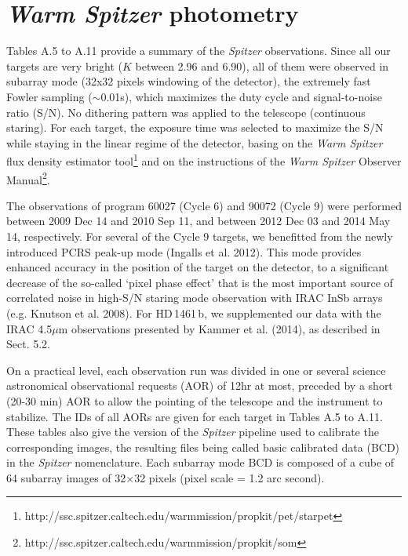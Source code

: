 \documentclass[traditabstract]{aa}
\begin{document}
\section{{\it Warm  Spitzer} photometry}

Tables A.5 to A.11 provide a summary of the {\it Spitzer} observations. Since all our targets are very bright ($K$ between
 2.96 and 6.90), all of them were observed in subarray mode (32x32 pixels windowing of the detector), the extremely
  fast Fowler sampling ($\sim$0.01s), which maximizes the duty cycle and signal-to-noise ratio (S/N). No dithering pattern 
  was applied to the telescope (continuous staring). For each target, the exposure time was selected to maximize the 
S/N while staying in the linear regime of the detector, basing on the  {\it Warm Spitzer} flux density estimator 
tool\footnote{http://ssc.spitzer.caltech.edu/warmmission/propkit/pet/starpet} and on the instructions of the 
{\it Warm Spitzer} Observer Manual\footnote{http://ssc.spitzer.caltech.edu/warmmission/propkit/som}.

The observations of program 60027 (Cycle 6) and 90072 (Cycle 9) were performed between 2009 Dec 14 and 2010 
Sep 11, and between 2012 Dec 03 and 2014 May 14, respectively. For several of the Cycle 9 targets, we benefitted 
from the  newly introduced PCRS peak-up mode (Ingalls et al. 2012). This mode provides enhanced accuracy in the 
position of the target on the detector,  to a significant decrease of the so-called `pixel phase effect' that is the most important 
source of correlated noise in high-S/N staring mode observation with IRAC InSb arrays (e.g. Knutson et al. 2008). 
For HD\,1461\,b, we supplemented our data with the IRAC 4.5$\mu$m observations presented by 
Kammer et al. (2014), as described in Sect. 5.2. 

On a practical level, each observation run was divided in one or several science astronomical observational requests (AOR) 
of 12hr at most, preceded by a short (20-30 min) AOR to allow the pointing of the telescope and the instrument to stabilize.
The IDs of all AORs are given for each target in Tables A.5 to A.11. These tables also give the version of the 
{\it Spitzer} pipeline used to calibrate the corresponding images, the resulting files being called basic calibrated 
data (BCD) in the {\it Spitzer} nomenclature. Each subarray mode BCD is composed of a cube of 64 subarray
 images of 32$\times$32 pixels (pixel scale  = 1.2 arc second).
\end{document}
